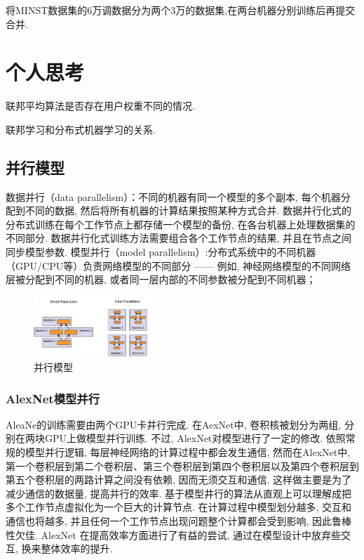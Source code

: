\documentclass[a4paper]{article}
\theoremstyle{definition}
\numberwithin{equation}{section}
\begin{document}
将MINST数据集的6万调数据分为两个3万的数据集,在两台机器分别训练后再提交合并. 
 
\section{个人思考}
联邦平均算法是否存在用户权重不同的情况. 

联邦学习和分布式机器学习的关系. 


\subsection{并行模型}

数据并行（data parallelism）：不同的机器有同一个模型的多个副本, 每个机器分配到不同的数据, 然后将所有机器的计算结果按照某种方式合并. 
数据并行化式的分布式训练在每个工作节点上都存储一个模型的备份, 在各台机器上处理数据集的不同部分. 数据并行化式训练方法需要组合各个工作节点的结果, 并且在节点之间同步模型参数. 
模型并行（model parallelism）:分布式系统中的不同机器（GPU/CPU等）负责网络模型的不同部分 —— 例如, 神经网络模型的不同网络层被分配到不同的机器, 或者同一层内部的不同参数被分配到不同机器；
\begin{figure}[!ht]
    \center
\includegraphics[width=0.4\textwidth]{paralle.png}
\caption{并行模型}
\label{parallelism}
\end{figure}


\subsubsection{AlexNet模型并行}
AleaNe的训练需要由两个GPU卡井行完成. 在AexNet中, 卷积核被划分为两组, 分别在两块GPU上做模型并行训练. 不过, AlexNet对模型进行了一定的修改. 依照常规的模型并行逻辑, 每层神经网络的计算过程中都会发生通信, 然而在AlexNet中, 第一个卷积层到第二个卷积层、第三个卷积层到第四个卷积层以及第四个卷积层到第五个卷积层的两路计算之间没有依赖, 因而无须交互和通信. 这样做主要是为了减少通信的数据量, 提高并行的效率. 
基于模型井行的算法从直观上可以理解成把多个工作节点虚拟化为一个巨大的计算节点. 在计算过程中模型划分越多, 交互和通信也将越多, 并且任何一个工作节点出现问题整个计算都会受到影响, 因此鲁棒性欠佳. AlexNet 在提高效率方面进行了有益的尝试, 通过在模型设计中放弃些交互, 换来整体效率的提升. 
\end{document}
